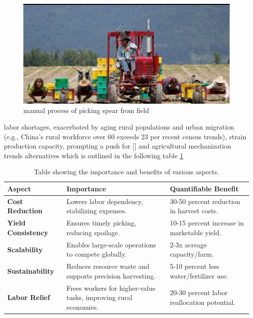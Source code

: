 \begin{figure}
    \centering
    \includegraphics[width=1\linewidth]{pictures/picking_labour.png}
    \caption{manual process of picking spear from field}
    \label{fig:enter-label}
\end{figure}
	

labor shortages, exacerbated by aging rural populations and urban migration (e.g., China’s rural workforce over 60 exceeds 23 per recent census trends), strain production capacity, prompting a push for [\cite{mccluskey2007economics}] and agricultural mechanization trends alternatives which is outlined in the following table \ref{tab:benefits}





\begin{table}[h]
    \centering
    \renewcommand{\arraystretch}{1.3}
    \begin{tabular}{|l|p{6cm}|p{5cm}|}
        \hline
        \textbf{Aspect} & \textbf{Importance} & \textbf{Quantifiable Benefit} \\
        \hline
        \textbf{Cost Reduction} & Lowers labor dependency, stabilizing expenses. & 30-50 percent reduction in harvest costs. \\
        \hline
        \textbf{Yield Consistency} & Ensures timely picking, reducing spoilage. & 10-15 percent increase in marketable yield. \\
        \hline
        \textbf{Scalability} & Enables large-scale operations to compete globally. & 2-3x acreage capacity/farm. \\
        \hline
        \textbf{Sustainability} & Reduces resource waste and supports precision harvesting. & 5-10 percent less water/fertilizer use. \\
        \hline
        \textbf{Labor Relief} & Frees workers for higher-value tasks, improving rural economies. & 20-30 percent labor reallocation potential. \\
        \hline
    \end{tabular}
    \caption{Table showing the importance and benefits of various aspects.}
    \label{tab:benefits}
\end{table}





